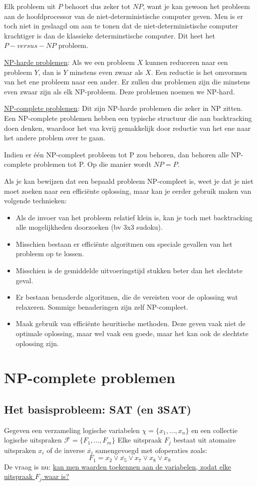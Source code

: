 \documentclass{report}
\begin{document}
Elk probleem uit $P$ behoort dus zeker tot $NP$, want je kan gewoon het probleem aan de hoofdprocessor van de niet-deterministische computer geven. Men is er toch niet in geslaagd om aan te tonen dat de niet-deterministische computer krachtiger is dan de klassieke determinstische computer. Dit heet het $P-versus-NP$ probleem.

\underline{NP-harde problemen}: Als we een probleem $X$ kunnen reduceren naar een probleem $Y$, dan is $Y$ minstens even zwaar als $X$. Een reductie is het omvormen van het ene probleem naar een ander. Er zullen dus problemen zijn die minstens even zwaar zijn als elk NP-probleem. Deze problemen noemen we NP-hard.

\underline{NP-complete problemen}: Dit zijn NP-harde problemen die zeker in NP zitten. Een NP-complete problemen hebben een typische structuur die aan backtracking doen denken, waardoor het vaa kvrij gemakkelijk door reductie van het ene naar het andere problem over te gaan.

Indien er één NP-compleet probleem tot P zou behoren, dan behoren alle NP-complete problemen tot P. Op die manier wordt $NP = P$.

Als je kan bewijzen dat een bepaald probleem NP-compleet is, weet je dat je niet moet zoeken naar een efficiënte oplossing, maar kan je eerder gebruik maken van volgende technieken:
\begin{itemize}
	\item Als de invoer van het probleem relatief klein is, kan je toch met backtracking alle mogelijkheden doorzoeken (bv 3x3 sudoku).
	\item Misschien bestaan er efficiënte algoritmen om speciale gevallen van het probleem op te lossen.
	\item Misschien is de gemiddelde uitvoeringstijd stukken beter dan het slechtste geval.
	\item Er bestaan benaderde algoritmen, die de vereisten voor de oplossing wat relaxeren. Sommige benaderingen zijn zelf NP-compleet.
	\item Maak gebruik van efficiënte heuritische methoden. Deze geven vaak niet de optimale oplossing, maar wel vaak een goede, maar het kan ook de slechtste oplossing zijn.
\end{itemize}


\section{NP-complete problemen}
\subsection{Het basisprobleem: SAT (en 3SAT)}
Gegeven een verzameling logische variabelen $\chi = \{x_1, ..., x_n\}$ en een collectie logische uitspraken $\mathcal{F} = \{F_1, ..., F_m \}$
Elke uitspraak $F_j$ bestaat uit atomaire uitspraken $x_i$ of de inverse $\overline{x_i}$ samengevoegd met ofoperaties zoals:
$$F_1 = x_2 \vee \overline{x_5} \vee x_7 \vee x_8 \vee x_9$$
De vraag is nu: \underline{kan men waarden toekennen aan de variabelen, zodat elke uitspraak $F_j$ waar is?} 
\end{document}
